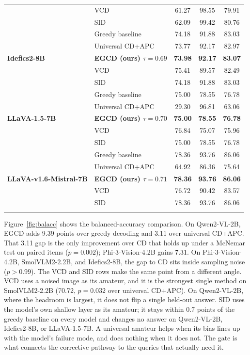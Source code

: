 \documentclass[pdflatex,sn-basic,Numbered]{sn-jnl}
\theoremstyle{thmstyleone}
\theoremstyle{thmstyletwo}
\theoremstyle{thmstylethree}
\begin{document}
\begin{table}[h]
\begin{tabular}{@{}llccc@{}}
 & VCD                        & 61.27 & 98.55 & 79.91 \\
 & SID                        & 62.09 & 99.42 & 80.76 \\
\midrule
\multirow{5}{*}{\textbf{Idefics2-8B}}
 & Greedy baseline            & 74.18 & 91.88 & 83.03 \\
 & Universal CD+APC           & 73.77 & 92.17 & 82.97 \\
 & \textbf{EGCD (ours) $\tau = 0.69$} & \textbf{73.98} & \textbf{92.17} & \textbf{83.07} \\
 & VCD                        & 75.41 & 89.57 & 82.49 \\
 & SID                        & 74.18 & 91.88 & 83.03 \\
\midrule
\multirow{5}{*}{\textbf{LLaVA-1.5-7B}}
 & Greedy baseline            & 75.00 & 78.55 & 76.78 \\
 & Universal CD+APC           & 29.30 & 96.81 & 63.06 \\
 & \textbf{EGCD (ours) $\tau = 0.70$} & \textbf{75.00} & \textbf{78.55} & \textbf{76.78} \\
 & VCD                        & 76.84 & 75.07 & 75.96 \\
 & SID                        & 75.00 & 78.55 & 76.78 \\
\midrule
\multirow{5}{*}{\textbf{LLaVA-v1.6-Mistral-7B}}
 & Greedy baseline            & 78.36 & 93.76 & 86.06 \\
 & Universal CD+APC           & 64.92 & 86.36 & 75.64 \\
 & \textbf{EGCD (ours) $\tau = 0.71$} & \textbf{78.36} & \textbf{93.76} & \textbf{86.06} \\
 & VCD                        & 76.72 & 90.42 & 83.57 \\
 & SID                        & 78.36 & 93.76 & 86.06 \\
\botrule
\end{tabular}
\end{table}

Figure~\ref{fig:balacc} shows the balanced-accuracy comparison. On Qwen2-VL-2B, EGCD adds 9.39 points over greedy decoding and 3.11 over universal CD+APC. That 3.11 gap is the only improvement over CD that holds up under a McNemar test \cite{dietterich1998approximate} on paired items ($p = 0.002$); Phi-3-Vision-4.2B gains 7.31. On Phi-3-Vision-4.2B, SmolVLM2-2.2B, and Idefics2-8B, the gap to CD sits inside sampling noise ($p > 0.99$). The VCD and SID rows make the same point from a different angle. VCD uses a noised image as its amateur, and it is the strongest single method on SmolVLM2-2.2B (70.72, $p = 0.032$ over universal CD+APC). On Qwen2-VL-2B, where the headroom is largest, it does not flip a single held-out answer. SID uses the model's own shallow layer as its amateur; it stays within 0.7 points of the greedy baseline on every model and changes no answer on Qwen2-VL-2B, Idefics2-8B, or LLaVA-1.5-7B. A universal amateur helps when its bias lines up with the model's failure mode, and does nothing when it does not. The gate is what connects the corrective pathway to the queries that actually need it.
\end{document}
